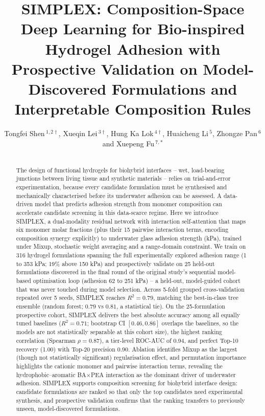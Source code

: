 \documentclass[utf8]{FrontiersinHarvard}
\def\firstAuthorLast{Shen, Lei, Hung, Li, Pan and Fu {et~al.}}
\def\Authors{Tongfei Shen\,$^{1,2\dagger}$, Xueqin Lei\,$^{3\dagger}$, Hung Ka Lok\,$^{4\dagger}$, Huaicheng Li\,$^{5}$, Zhongze Pan\,$^{6}$ and Xuepeng Fu\,$^{7,*}$}
\begin{document}
\onecolumn
{}

\title[SIMPLEX: composition-space deep learning for hydrogel adhesion screening]{SIMPLEX: Composition-Space Deep Learning for Bio-inspired Hydrogel Adhesion with Prospective Validation on Model-Discovered Formulations and Interpretable Composition Rules}

\author[\firstAuthorLast ]{\Authors}
\address{}
\correspondance{}
\extraAuth{}
\maketitle

\begin{abstract}
\section{}
The design of functional hydrogels for biohybrid interfaces -- wet, load-bearing junctions between living tissue and synthetic materials -- relies on trial-and-error experimentation, because every candidate formulation must be synthesised and mechanically characterised before its underwater adhesion can be assessed. A data-driven model that predicts adhesion strength from monomer composition can accelerate candidate screening in this data-scarce regime. Here we introduce SIMPLEX, a dual-modality residual network with interaction self-attention that maps six monomer molar fractions (plus their 15 pairwise interaction terms, encoding composition synergy explicitly) to underwater glass adhesion strength (kPa), trained under Mixup, stochastic weight averaging and a range-domain constraint. We train on 316 hydrogel formulations spanning the full experimentally explored adhesion range (1 to 353 kPa; 19\% above 150 kPa) and prospectively validate on 25 held-out formulations discovered in the final round of the original study's sequential model-based optimisation loop (adhesion 62 to 251 kPa) -- a held-out, model-guided cohort that was never touched during model selection. Across 5-fold grouped cross-validation repeated over 5 seeds, SIMPLEX reaches $R^2 = 0.79$, matching the best-in-class tree ensemble (random forest; $0.79$ vs $0.81$, a statistical tie). On the 25-formulation prospective cohort, SIMPLEX delivers the best absolute accuracy among all equally tuned baselines ($R^2 = 0.71$; bootstrap CI $[0.46, 0.86]$ overlaps the baselines, so the models are not statistically separable at this cohort size), the highest ranking correlation (Spearman $\rho = 0.87$), a tier-level ROC-AUC of 0.94, and perfect Top-10 recovery (1.00) with Top-20 precision 0.90. Ablation identifies Mixup as the largest (though not statistically significant) regularisation effect, and permutation importance highlights the cationic monomer and pairwise interaction terms, revealing the hydrophobic--aromatic BA$\times$PEA interaction as the dominant driver of underwater adhesion. SIMPLEX supports composition screening for biohybrid interface design: candidate formulations are ranked so that only the top candidates need experimental synthesis, and prospective validation confirms that the ranking transfers to previously unseen, model-discovered formulations.


\end{abstract}
\end{document}
